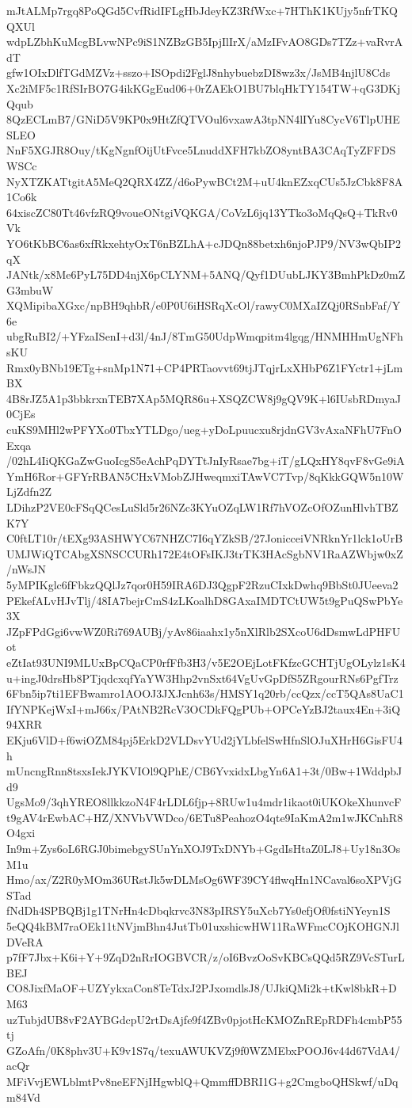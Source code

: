 mJtALMp7rgq8PoQGd5CvfRidIFLgHbJdeyKZ3RfWxc+7HThK1KUjy5nfrTKQQXUl
wdpLZbhKuMcgBLvwNPc9iS1NZBzGB5IpjIlIrX/aMzIFvAO8GDs7TZz+vaRvrAdT
gfw1OIxDlfTGdMZVz+sszo+ISOpdi2FglJ8nhybuebzDI8wz3x/JsMB4njlU8Cds
Xc2iMF5c1RfSIrBO7G4ikKGgEud06+0rZAEkO1BU7blqHkTY154TW+qG3DKjQqub
8QzECLmB7/GNiD5V9KP0x9HtZfQTVOul6vxawA3tpNN4lIYu8CycV6TlpUHESLEO
NnF5XGJR8Ouy/tKgNgnfOijUtFvce5LnuddXFH7kbZO8yntBA3CAqTyZFFDSWSCc
NyXTZKATtgitA5MeQ2QRX4ZZ/d6oPywBCt2M+uU4knEZxqCUs5JzCbk8F8A1Co6k
64xiscZC80Tt46vfzRQ9voueONtgiVQKGA/CoVzL6jq13YTko3oMqQsQ+TkRv0Vk
YO6tKbBC6as6xfRkxehtyOxT6nBZLhA+cJDQn88betxh6njoPJP9/NV3wQbIP2qX
JANtk/x8Me6PyL75DD4njX6pCLYNM+5ANQ/Qyf1DUubLJKY3BmhPkDz0mZG3mbuW
XQMipibaXGxc/npBH9qhbR/e0P0U6iHSRqXcOl/rawyC0MXaIZQj0RSnbFaf/Y6e
ubgRuBI2/+YFzaISenI+d3l/4nJ/8TmG50UdpWmqpitm4lgqg/HNMHHmUgNFhsKU
Rmx0yBNb19ETg+snMp1N71+CP4PRTaovvt69tjJTqjrLxXHbP6Z1FYctr1+jLmBX
4B8rJZ5A1p3bbkrxnTEB7XAp5MQR86u+XSQZCW8j9gQV9K+l6IUsbRDmyaJ0CjEs
cuKS9MHl2wPFYXo0TbxYTLDgo/ueg+yDoLpuucxu8rjdnGV3vAxaNFhU7FnOExqa
/02hL4IiQKGaZwGuoIcgS5eAchPqDYTtJnIyRsae7bg+iT/gLQxHY8qvF8vGe9iA
YmH6Ror+GFYrRBAN5CHxVMobZJHweqmxiTAwVC7Tvp/8qKkkGQW5n10WLjZdfn2Z
LDihzP2VE0cFSqQCesLuSld5r26NZc3KYuOZqLW1Rf7hVOZcOfOZunHlvhTBZK7Y
C0ftLT10r/tEXg93ASHWYC67NHZC7I6qYZkSB/27JonicceiVNRknYr1lck1oUrB
UMJWiQTCAbgXSNSCCURh172E4tOFsIKJ3trTK3HAcSgbNV1RaAZWbjw0xZ/nWsJN
5yMPIKglc6fFbkzQQlJz7qor0H59IRA6DJ3QgpF2RzuCIxkDwhq9BbSt0JUeeva2
PEkefALvHJvTlj/48IA7bejrCmS4zLKoalhD8GAxaIMDTCtUW5t9gPuQSwPbYe3X
JZpFPdGgi6vwWZ0Ri769AUBj/yAv86iaahx1y5nXlRlb2SXcoU6dDsmwLdPHFUot
eZtIat93UNI9MLUxBpCQaCP0rfFfb3H3/v5E2OEjLotFKfzcGCHTjUgOLylz1sK4
u+ingJ0drsHb8PTjqdcxqfYaYW3Hhp2vnSxt64VgUvGpDfS5ZRgourRNs6PgfTrz
6Fbn5ip7ti1EFBwamro1AOOJ3JXJcnh63s/HMSY1q20rb/ccQzx/ccT5QAs8UaC1
IfYNPKejWxI+mJ66x/PAtNB2RcV3OCDkFQgPUb+OPCeYzBJ2taux4En+3iQ94XRR
EKju6VlD+f6wiOZM84pj5ErkD2VLDsvYUd2jYLbfelSwHfnSlOJuXHrH6GisFU4h
mUncngRnn8tsxsIekJYKVIOl9QPhE/CB6YvxidxLbgYn6A1+3t/0Bw+1WddpbJd9
UgsMo9/3qhYREO8llkkzoN4F4rLDL6fjp+8RUw1u4mdr1ikaot0iUKOkeXhunvcF
t9gAV4rEwbAC+HZ/XNVbVWDco/6ETu8PeahozO4qte9IaKmA2m1wJKCnhR8O4gxi
In9m+Zys6oL6RGJ0bimebgySUnYnXOJ9TxDNYb+GgdIsHtaZ0LJ8+Uy18n3OsM1u
Hmo/ax/Z2R0yMOm36URstJk5wDLMsOg6WF39CY4flwqHn1NCaval6soXPVjGSTad
fNdDh4SPBQBj1g1TNrHn4cDbqkrvc3N83pIRSY5uXcb7Ys0efjOf0fstiNYeyn1S
5eQQ4kBM7raOEk11tNVjmBhn4JutTb01uxshicwHW11RaWFmcCOjKOHGNJlDVeRA
p7fF7Jbx+K6i+Y+9ZqD2nRrIOGBVCR/z/oI6BvzOoSvKBCsQQd5RZ9VcSTurLBEJ
CO8JixfMaOF+UZYykxaCon8TeTdxJ2PJxomdlsJ8/UJkiQMi2k+tKwl8bkR+DM63
uzTubjdUB8vF2AYBGdcpU2rtDsAjfe9f4ZBv0pjotHcKMOZnREpRDFh4cmbP55tj
GZoAfn/0K8phv3U+K9v1S7q/texuAWUKVZj9f0WZMEbxPOOJ6v44d67VdA4/acQr
MFiVvjEWLblmtPv8neEFNjIHgwblQ+QmmffDBRI1G+g2CmgboQHSkwf/uDqm84Vd
